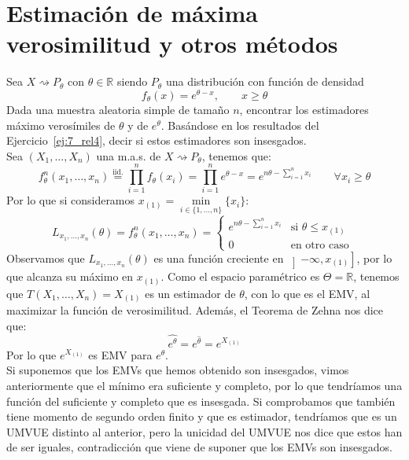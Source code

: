 \newpage
\section{Estimación de máxima verosimilitud y otros métodos}
\begin{ejercicio}
    Sea $X\rightsquigarrow P_\theta$ con $\theta\in \mathbb{R}$ siendo $P_\theta$ una distribución con función de densidad
    \begin{equation*}
        f_\theta(x) = e^{\theta-x}, \qquad x\geq \theta
    \end{equation*}
    Dada una muestra aleatoria simple de tamaño $n$, encontrar los estimadores máximo verosímiles de $\theta$ y de $e^\theta$. Basándose en los resultados del Ejercicio~\ref{ej:7_rel4}, decir si estos estimadores son insesgados.\\

    \noindent
    Sea $(X_1, \ldots, X_n)$ una m.a.s. de $X\rightsquigarrow  P_\theta$, tenemos que:
    \begin{equation*}
        f^n_\theta(x_1, \ldots, x_n) \stackrel{\text{iid.}}{=} \prod_{i=1}^{n}f_\theta(x_i) = \prod_{i=1}^{n} e^{\theta-x} = e^{n\theta - \sum\limits_{i=1}^n x_i} \qquad \forall x_i \geq \theta
    \end{equation*}
    Por lo que si consideramos $x_{(1)} = \min\limits_{i \in \{1,\ldots,n\}}\{x_i\}$:
    \begin{equation*}
        L_{x_1,\ldots, x_n}(\theta) = f^n_\theta(x_1,\ldots,x_n) = \left\{\begin{array}{ll}
                e^{n\theta - \sum\limits_{i=1}^n x_i}  & \text{si\ } \theta \leq x_{(1)}  \\
             0 & \text{en otro caso\ } 
        \end{array}\right. 
    \end{equation*}
    Observamos que $L_{x_1,\ldots,x_n}(\theta)$ es una función creciente en $\left]-\infty,x_{(1)}\right]$, por lo que alcanza su máximo en $x_{(1)}$. Como el espacio paramétrico es $\Theta = \mathbb{R}$, tenemos que $T(X_1, \ldots, X_n) = X_{(1)}$ es un estimador de $\theta$, con lo que es el EMV, al maximizar la función de verosimilitud. Además, el Teorema de Zehna nos dice que:
    \begin{equation*}
        \widehat{e^\theta} = e^{\hat{\theta}} = e^{X_{(1)}}
    \end{equation*}
    Por lo que $e^{X_{(1)}}$ es EMV para $e^{\theta}$.\\ %

    \noindent
    Si suponemos que los EMVs que hemos obtenido son insesgados, vimos anteriormente que el mínimo era suficiente y completo, por lo que tendríamos una función del suficiente y completo que es insesgada. Si comprobamos que también tiene momento de segundo orden finito y que es estimador, tendríamos que es un UMVUE distinto al anterior, pero la unicidad del UMVUE nos dice que estos han de ser iguales, contradicción que viene de suponer que los EMVs son insesgados.
\end{ejercicio}

